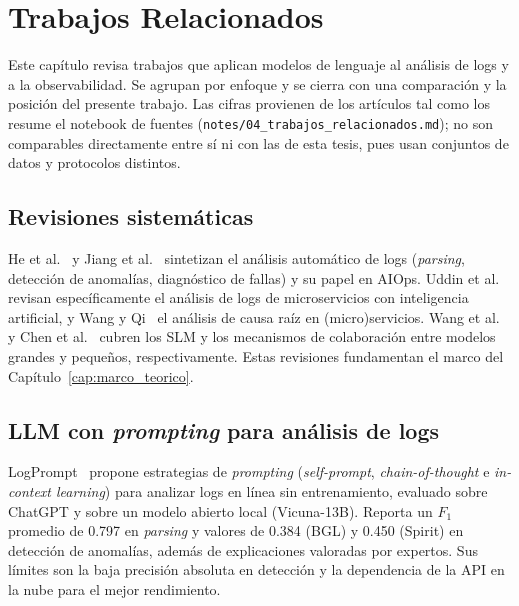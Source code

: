 \chapter{Trabajos Relacionados} \label{cap:trabajos_relacionados}

Este capítulo revisa trabajos que aplican modelos de lenguaje al análisis de logs y a la observabilidad. Se agrupan por enfoque y se cierra con una comparación y la posición del presente trabajo. Las cifras provienen de los artículos tal como los resume el notebook de fuentes (\texttt{notes/04\_trabajos\_relacionados.md}); no son comparables directamente entre sí ni con las de esta tesis, pues usan conjuntos de datos y protocolos distintos. %

\section{Revisiones sistemáticas}\label{sec:tr_revisiones}

He et al.~\cite{he2021_survey} y Jiang et al.~\cite{jiang2021_aiops} sintetizan el análisis automático de logs (\textit{parsing}, detección de anomalías, diagnóstico de fallas) y su papel en AIOps. Uddin et al.~\cite{uddin2026_microservice_logs} revisan específicamente el análisis de logs de microservicios con inteligencia artificial, y Wang y Qi~\cite{wang2024_rca} el análisis de causa raíz en (micro)servicios. Wang et al.~\cite{wang2025_slm_survey} y Chen et al.~\cite{chen2025_collab_survey} cubren los SLM y los mecanismos de colaboración entre modelos grandes y pequeños, respectivamente. Estas revisiones fundamentan el marco del Capítulo~\ref{cap:marco_teorico}.

\section{LLM con \textit{prompting} para análisis de logs}\label{sec:tr_prompting}

LogPrompt~\cite{liu2024_logprompt} propone estrategias de \textit{prompting} (\textit{self-prompt}, \textit{chain-of-thought} e \textit{in-context learning}) para analizar logs en línea sin entrenamiento, evaluado sobre ChatGPT y sobre un modelo abierto local (Vicuna-13B). Reporta un $F_1$ promedio de 0.797 en \textit{parsing} y valores de 0.384 (BGL) y 0.450 (Spirit) en detección de anomalías, además de explicaciones valoradas por expertos. Sus límites son la baja precisión absoluta en detección y la dependencia de la API en la nube para el mejor rendimiento.

